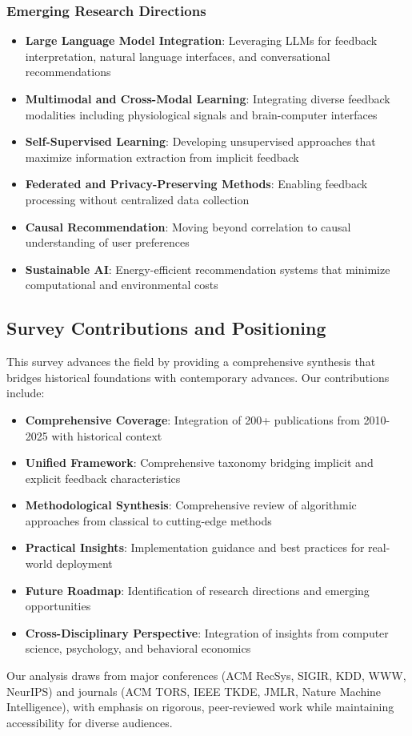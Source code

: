 \subsubsection{Emerging Research Directions}

\begin{itemize}
    \item \textbf{Large Language Model Integration}: Leveraging LLMs for feedback interpretation, natural language interfaces, and conversational recommendations
    \item \textbf{Multimodal and Cross-Modal Learning}: Integrating diverse feedback modalities including physiological signals and brain-computer interfaces
    \item \textbf{Self-Supervised Learning}: Developing unsupervised approaches that maximize information extraction from implicit feedback
    \item \textbf{Federated and Privacy-Preserving Methods}: Enabling feedback processing without centralized data collection
    \item \textbf{Causal Recommendation}: Moving beyond correlation to causal understanding of user preferences
    \item \textbf{Sustainable AI}: Energy-efficient recommendation systems that minimize computational and environmental costs
\end{itemize}

\subsection{Survey Contributions and Positioning}

This survey advances the field by providing a comprehensive synthesis that bridges historical foundations with contemporary advances. Our contributions include:

\begin{itemize}
    \item \textbf{Comprehensive Coverage}: Integration of 200+ publications from 2010-2025 with historical context
    \item \textbf{Unified Framework}: Comprehensive taxonomy bridging implicit and explicit feedback characteristics
    \item \textbf{Methodological Synthesis}: Comprehensive review of algorithmic approaches from classical to cutting-edge methods
    \item \textbf{Practical Insights}: Implementation guidance and best practices for real-world deployment
    \item \textbf{Future Roadmap}: Identification of research directions and emerging opportunities
    \item \textbf{Cross-Disciplinary Perspective}: Integration of insights from computer science, psychology, and behavioral economics
\end{itemize}

Our analysis draws from major conferences (ACM RecSys, SIGIR, KDD, WWW, NeurIPS) and journals (ACM TORS, IEEE TKDE, JMLR, Nature Machine Intelligence), with emphasis on rigorous, peer-reviewed work while maintaining accessibility for diverse audiences.